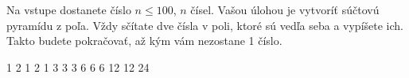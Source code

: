 




Na vstupe dostanete číslo $n \leq 100$,  $n$ čísel. Vašou úlohou je vytvoríť súčtovú pyramídu z poľa. Vždy sčítate dve čísla v poli, ktoré sú vedľa seba a vypíšete ich. Takto budete pokračovať, až kým vám nezostane 1 číslo.  

1 2 1 2 1
  3  3  3  
6  6  6  
12  12  
24  
\koniec


